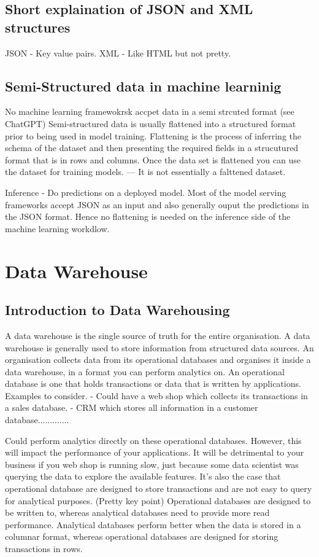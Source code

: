 \documentclass[a4paper, 11pt]{article}
\begin{document}
    \subsection{Short explaination of JSON and XML structures}
    JSON - Key value pairs.
    XML - Like HTML but not pretty.

    \subsection{Semi-Structured data in machine learninig}
    No machine learning framewokrsk accpet data in a semi strcuted format (see ChatGPT)
    Semi-structured data is usually flattened into a structured format prior to being used in model training.
    Flattening is the process of inferring the schema of the dataset and then presenting the required fields in a strucutured format that is in rows and columns.
    Once the data set is flattened you can use the dataset for training models.
    --- It is not essentially a falttened dataset.

    Inference
    - Do predictions on a deployed model.
    Most of the model serving frameworks accept JSON as an input and also generally ouput the predictions in the JSON format.
    Hence no flattening is needed on the inference side of the machine learning workdlow.


    \section{Data Warehouse}

    \subsection{Introduction to Data Warehousing}
    A data warehouse is the single source of truth for the entire organisation.
    A data warehouse is generally used to store information from structured data sources.
    An organisation collects data from its operational databases and organises it inside a data warehouse, in a format you can perform analytics on.
    An operational database is one that holds transactions or data that is written by applications.
    Examples to consider.
    - Could have a web shop which collects its transactions in a sales database.
    - CRM which stores all information in a customer database.............

    Could perform analytics directly on these operational databases.
    However, this will impact the performance of your applications.
    It will be detrimental to your business if you web shop is running slow, just because some data scientist was querying the data to explore the available features.
    It's also the case that operational database are designed to store transactions and are not easy to query for analytical purposes. (Pretty key point)
    Operational databases are designed to be written to, whereas analytical databases need to provide more read performance.
    Analytical databases perform better when the data is stored in a columnar format, whereas operational databases are designed for storing transactions in rows.
\end{document}
